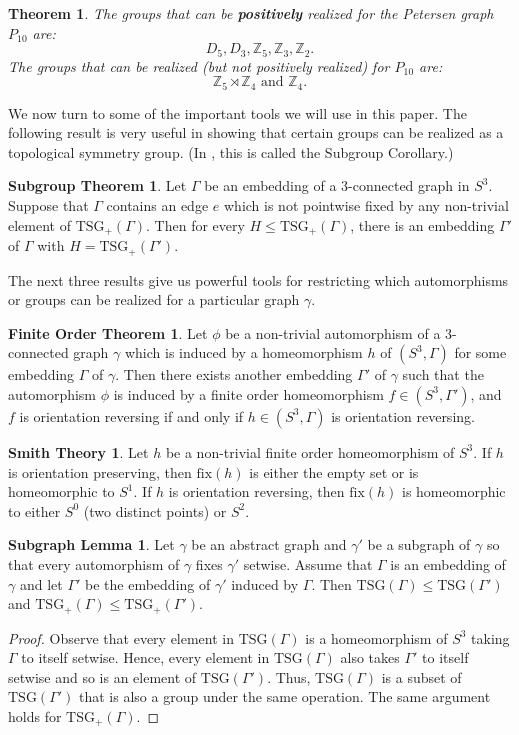 \documentclass[11]{amsart}
\def\Z{\mathbb{Z}}
\newcommand{\semi}{{\rtimes}}
\def\TSG{{\mathrm{TSG}}}
\def\fix{{\mathrm{fix}}}
\newtheorem{theorem}{Theorem}[section]
\theoremstyle{definition}
\newtheorem*{subgroupcor}{Subgroup Theorem}
\newtheorem*{smith}{Smith Theory}
\newtheorem*{finiteorder}{Finite Order Theorem}
\newtheorem*{subgraph}{Subgraph Lemma}
\theoremstyle{remark}
\begin{document}
\begin{theorem} \cite{cfhltv}
The groups that can be {\bf positively} realized for the Petersen graph $P_{10}$ are:
$$D_5, D_3, \Z_5, \Z_3, \Z_2.$$
The groups that can be realized (but not positively realized) for $P_{10}$ are:
$$\Z_5 \semi \Z_4 \text{ and } \Z_4.$$
\end{theorem}

We now turn to some of the important tools we will use in this paper. The following result is very useful in showing that certain groups can be realized as a topological symmetry group. (In \cite{fmn1}, this is called the Subgroup Corollary.)

\begin{subgroupcor}\cite{fmn1} 
\label{subgroup}
Let $\Gamma$ be an embedding of a 3-connected graph in $S^3$.  Suppose that $\Gamma$ contains an edge $e$ which is not pointwise fixed by any non-trivial element of $\TSG_+(\Gamma)$.  Then for every $H \leq \TSG_+(\Gamma)$, there is an embedding $\Gamma'$ of $\Gamma$ with $H = \TSG_+(\Gamma')$.
\end{subgroupcor}

The next three results give us powerful tools for restricting which automorphisms or groups can be realized for a particular graph $\gamma$.

\begin{finiteorder}\cite{f2}
Let $\phi$ be a non-trivial automorphism of a 3-connected graph $\gamma$ which is induced by a homeomorphism $h$ of $ (S^3, \Gamma)$ for some embedding $\Gamma$ of $\gamma$. Then there exists another embedding $\Gamma'$ of $\gamma$ such that the automorphism $\phi$ is induced by a finite order homeomorphism $f \in (S^3, \Gamma')$, and $f$ is orientation reversing if and only if $h \in (S^3, \Gamma)$ is orientation reversing. 
\end{finiteorder}

\begin{smith} \cite{sm}
Let $h$ be a non-trivial finite order homeomorphism of $S^3$.  If $h$ is orientation preserving, then $\fix(h)$ is either the empty set or is homeomorphic to $S^1$.  If $h$ is orientation reversing, then $\fix(h)$ is homeomorphic to either $S^0$ (two distinct points) or $S^2$.
\end{smith}

\begin{subgraph}
Let $\gamma$ be an abstract graph and $\gamma'$ be a subgraph of $\gamma$ so that every automorphism of $\gamma$ fixes $\gamma'$ setwise.  Assume that $\Gamma$ is an embedding of $\gamma$ and let $\Gamma'$ be the embedding of $\gamma'$ induced by $\Gamma$.  Then $\TSG(\Gamma) \leq \TSG(\Gamma')$ and $\TSG_+(\Gamma) \leq \TSG_+(\Gamma')$.  
\end{subgraph}
\begin{proof}
Observe that every element in $\TSG(\Gamma)$ is a homeomorphism of $S^3$ taking $\Gamma$ to itself setwise.  Hence, every element in $\TSG(\Gamma)$ also takes $\Gamma'$ to itself setwise and so is an element of $\TSG(\Gamma')$. Thus, $\TSG(\Gamma)$ is a subset of $\TSG(\Gamma')$ that is also a group under the same operation.  The same argument holds for $\TSG_+(\Gamma)$. 
\end{proof}
\end{document}
